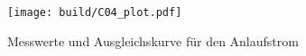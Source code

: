 \begin{figure}[h]
    \centering
    \texttt{[image: build/C04\_plot.pdf]}
    \caption{Messwerte und Ausgleichskurve für den Anlaufstrom}
    \label{fig:c03}
\end{figure}